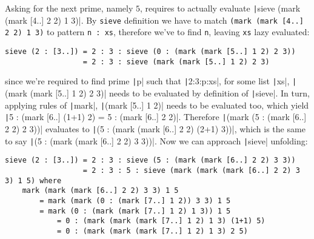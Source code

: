 Asking for the next prime, namely $5$, requires to actually evaluate
\texttt|sieve (mark (mark [4..] 2 2) 1 3)|. By \texttt{sieve} definition we have
to match \texttt{(mark (mark [4..] 2 2) 1 3)} to pattern \texttt{n : xs}, therefore we've to
find \texttt{n}, leaving \texttt{xs} lazy evaluated:
\begin{verbatim}
sieve (2 : [3..]) = 2 : 3 : sieve (0 : (mark (mark [5..] 1 2) 2 3)) 
                  = 2 : 3 : sieve (mark (mark [5..] 1 2) 2 3)
\end{verbatim}
since we're required to find prime \texttt|p| such that \texttt|2:3:p:xs|,
for some list \texttt|xs|, \texttt|(mark (mark [5..] 1 2) 2 3)|
needs to be evaluated by definition of \texttt|sieve|. In turn,
applying rules of \texttt|mark|, \texttt|(mark [5..] 1 2)| needs
to be evaluated too, which yield \texttt|5 : (mark [6..] (1+1) 2) = 5 : (mark [6..] 2 2)|.
Therefore \texttt|(mark (5 : (mark [6..] 2 2) 2 3))| evaluates to
\texttt|(5 : (mark (mark [6..] 2 2) (2+1) 3))|, which is
the same to say \texttt|(5 : (mark (mark [6..] 2 2) 3 3))|.
Now we can approach \texttt|sieve| unfolding:
\begin{verbatim}
sieve (2 : [3..]) = 2 : 3 : sieve (5 : (mark (mark [6..] 2 2) 3 3))
                  = 2 : 3 : 5 : sieve (mark (mark (mark [6..] 2 2) 3 3) 1 5) where
    mark (mark (mark [6..] 2 2) 3 3) 1 5
        = mark (mark (0 : (mark [7..] 1 2)) 3 3) 1 5  
        = mark (0 : (mark (mark [7..] 1 2) 1 3)) 1 5
            = 0 : (mark (mark (mark [7..] 1 2) 1 3) (1+1) 5)
            = 0 : (mark (mark (mark [7..] 1 2) 1 3) 2 5)
\end{verbatim}

